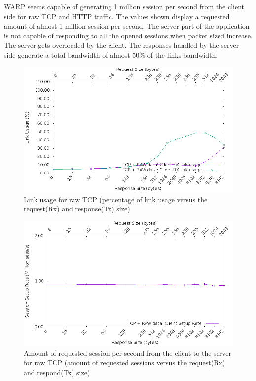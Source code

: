 WARP seems capable of generating 1 million session per second from the client side for raw TCP and HTTP traffic. The values shown display a requested amount of almost 1 million session per second. The server part of the application is not capable of responding to all the opened sessions when packet sized increase. The server gets overloaded by the client. The responses handled by the server side generate a total bandwidth of almost 50\% of the links bandwidth.  

\begin{figure}[H]
  \includegraphics[scale=0.6]{images/raw_link_usage.png}
  \caption{Link usage for raw TCP (percentage of link usage versus the request(Rx) and response(Tx) size)}
  \label{fig:rawtcplink}
\end{figure}

\begin{figure}[H]
  \includegraphics[scale=0.6]{images/raw_setup.png}
  \caption{Amount of requested session per second from the client to the server for raw TCP (amount of requested sessions versus the request(Rx) and respond(Tx) size)}
  \label{fig:rawtcpsession}
\end{figure}


